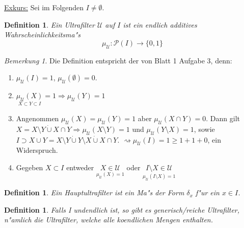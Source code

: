 \documentclass[a4paper,12pt,numbers=noenddot,parskip=full]{scrartcl}
\newcommand{\scrU}{\mathcal{U}}
\newcommand{\scrP}{\mathcal{P}}
\newcommand{\heading}{\underline}
\theoremstyle{dotless}
\newtheorem{definition}[theorem]{Definition}
\theoremstyle{remark}
\newtheorem*{remark}{Bemerkung}
\begin{document}
	\heading{Exkurs:} Sei im Folgenden $I \ne \emptyset$.
	\begin{definition}
		Ein Ultrafilter $\scrU$ auf $I$ ist ein endlich additives Wahrscheinlichkeitsma"s
		\begin{equation*}
			\mu_\scrU : \scrP(I) \longrightarrow \{0,1\}
		\end{equation*}
	\end{definition}
	\begin{remark}
		Die Definition entspricht der von Blatt 1 Aufgabe 3, denn:
		\begin{enumerate}
			\item $\mu_\scrU(I)=1$, $\mu_\scrU(\emptyset)=0$.
			\item $\underset{X\subset Y \subset I}{\mu_\scrU(X)}=1 \Rightarrow \mu_\scrU(Y)=1$
			\item Angenommen $\mu_\scrU(X)=\mu_\scrU(Y) = 1$ aber $\mu_\scrU(X \cap Y) = 0$. Dann gilt $X = X \setminus Y \dot\cup X \cap Y \Rightarrow \mu_\scrU(X \setminus Y) = 1$ und $\mu_\scrU(Y \setminus X) =1$, sowie $I \supset X \cup Y = X \setminus Y \dot\cup Y\setminus X \dot\cup X \cap Y$. $\rightsquigarrow \mu_\scrU(I)= 1 \geq 1+1+0$, ein Widerspruch.
			\item Gegeben $X \subset I$ entweder $\underset{\mu_\scrU(X)=1}{X \in \scrU}$ oder $\underset{\mu_\scrU(I\setminus X)=1}{I\setminus X \in \scrU}$
		\end{enumerate}
	\end{remark}
	
	\begin{definition}
		Ein Hauptultrafilter ist ein Ma"s der Form $\delta_x$ f"ur ein $x \in I$.
	\end{definition}

	\begin{definition}
		Falls I undendlich ist, so gibt es generisch/reiche Ultrafilter, n"amlich die Ultrafilter, welche alle koendlichen Mengen enthalten.
	\end{definition}
\end{document}
